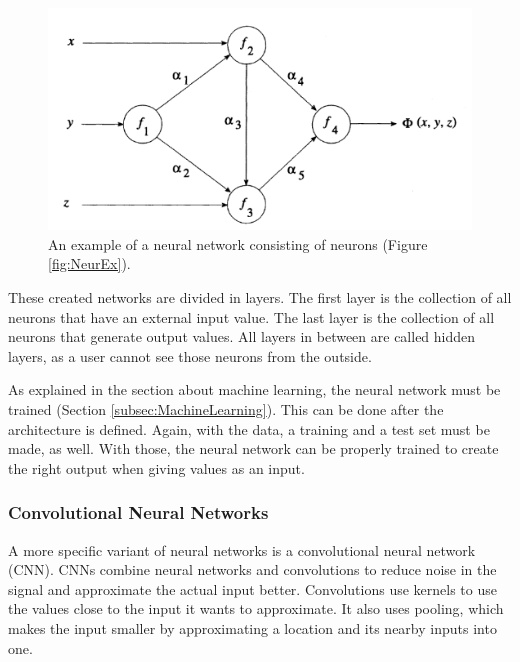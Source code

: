 \documentclass[10pt,a4paper]{report}
\begin{document}
	\begin{figure}[h!]
		\includegraphics{NeuralNetworkExample.PNG}
		\caption{An example of a neural network consisting of neurons (Figure 
			\ref{fig:NeurEx}).  \cite{rojas2013neural}}
		\label{fig:NeurNetEx}
	\end{figure}
	
	These created networks are divided in layers. The first layer is the 
	collection of all neurons that have an external input value. The last layer 
	is the collection of all neurons that generate output values. All layers in 
	between are called hidden layers, as a user cannot see those neurons from 
	the outside. \cite{Wang2003}
	
	As explained in the section about machine learning, the neural network must 
	be trained (Section \ref{subsec:MachineLearning}). This can be done after 
	the architecture is defined. Again, with the data, a training and a test 
	set must be made, as well. With those, the neural network can be properly 
	trained to create the right output when giving values as an input. 
	 \cite{Wang2003}
	
	\subsubsection{Convolutional Neural Networks}
	
	A more specific variant of neural networks is a convolutional neural 
	network (CNN). CNNs combine neural networks and convolutions to reduce 
	noise in the signal and approximate the actual input better. Convolutions 
	use kernels to use the values close to the input it wants to approximate. 
	It also uses pooling, which makes the input smaller by approximating a 
	location and its nearby inputs into one.  \cite{Goodfellow-et-al-2016}
	
\end{document}

